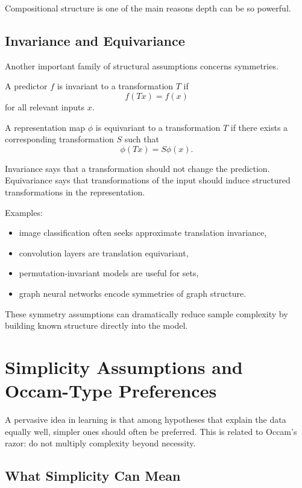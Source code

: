 Compositional structure is one of the main reasons depth can be so powerful.

\subsection{Invariance and Equivariance}

Another important family of structural assumptions concerns symmetries.

\begin{definition}[Invariance]
A predictor $f$ is invariant to a transformation $T$ if
\[
f(Tx)=f(x)
\]
for all relevant inputs $x$.
\end{definition}

\begin{definition}[Equivariance]
A representation map $\phi$ is equivariant to a transformation $T$ if there exists a corresponding transformation $S$ such that
\[
\phi(Tx)=S\phi(x).
\]
\end{definition}

Invariance says that a transformation should not change the prediction. Equivariance says that transformations of the input should induce structured transformations in the representation.

Examples:
\begin{itemize}
    \item image classification often seeks approximate translation invariance,
    \item convolution layers are translation equivariant,
    \item permutation-invariant models are useful for sets,
    \item graph neural networks encode symmetries of graph structure.
\end{itemize}

These symmetry assumptions can dramatically reduce sample complexity by building known structure directly into the model.

\section{Simplicity Assumptions and Occam-Type Preferences}

A pervasive idea in learning is that among hypotheses that explain the data equally well, simpler ones should often be preferred. This is related to Occam's razor: do not multiply complexity beyond necessity.

\subsection{What Simplicity Can Mean}

